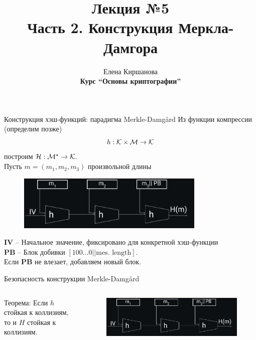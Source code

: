 \documentclass[usenames,dvipsnames,8pt,aspectratio=169]{beamer}
\title{Лекция №5 \\[10pt]
	Часть 2. Конструкция Меркла-Дамгора}
\date{ Елена Киршанова \\  \textbf{Курс ``Основы криптографии''} \\  }
\begin{document}
	
\begin{frame}
	\titlepage
\end{frame}


\begin{frame}{Конструкция хэш-функций: парадигма Merkle-Damg\aa rd}
\Large
Из функции компрессии (определим позже) \[h: \mathcal{K} \times \mathcal{M} \rightarrow \mathcal{K}\]
построим $\mathcal{H}: \mathcal{M}^\star \rightarrow \mathcal{K}.$ \\[10pt]

Пусть $m = (m_1, m_2, m_3 )$ произвольной длины
	\begin{figure}
		\includegraphics[width=0.8\textwidth]{MerkleDamgard}
	\end{figure}

\textbf{IV} -- Начальное значение, фиксировано для конкретной хэш-функции \\
\textbf{PB} -- Блок добивки $\left[100\ldots0 || \text{mes.\ length}\right]$. \\
Если \textbf{PB}  не влезает, добавляем новый блок.

\end{frame}

\begin{frame}{Безопасность конструкции Merkle-Damg\aa rd}
\Large
\vspace{-8em}
\begin{columns}[T]
	\begin{column}{0.5\textwidth}
	{\color{Orange} Теорема:} Если $h$ стойкая к коллизиям, то и  $H$ стойкая к коллизиям.
	\end{column}
\begin{column}{0.5\textwidth}
\begin{figure}
	\includegraphics[width=\textwidth]{MerkleDamgard}
\end{figure}
\end{column}
\end{columns}




\end{frame}
\end{document}
